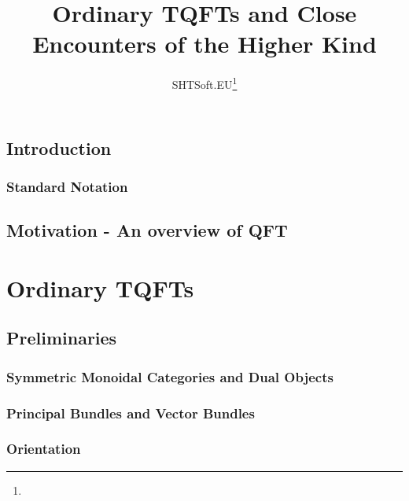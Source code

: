 \documentclass[a4paper,11pt,psamsfonts,reqno]{amsbook}
\newcounter{prpcounter}
\theoremstyle{proposition}
\theoremstyle{proof}
\begin{document}
\title{Ordinary TQFTs and Close Encounters of the Higher Kind}
\author{SHTSoft.EU\footnote{\datename{ \today}}}
\maketitle
\tableofcontents





\chapter{Introduction}
\label{chap:intro}



\section{Standard Notation}
\label{sec:notation}




\chapter{Motivation - An overview of QFT}
\label{chap:motqft}





\part{Ordinary TQFTs}
\label{part:ordinary}





\chapter{Preliminaries}
\label{chap:prelim1}


\section{Symmetric Monoidal Categories and Dual Objects}
\label{sec:smoncatdual}


\section{Principal Bundles and Vector Bundles}
\label{sec:bundles}


\section{Orientation}
\label{sec:orient}

\end{document}

